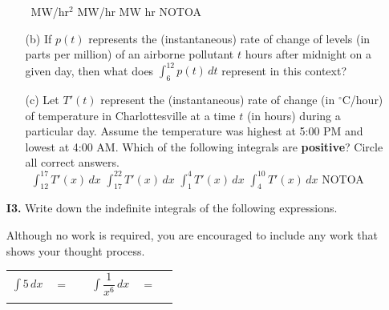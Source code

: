 \documentclass[11pt]{article}
\begin{document}
\begin{itemize}
\begin{itemize}
                \,\hfill
                 MW/hr$^2$
                \hfill
                 MW/hr
                \hfill
                 MW
                \hfill
                 hr
                \hfill
                 NOTOA
                \hfill\,\\
                \medskip{}

            \item[(b)] If $p(t)$ represents the (instantaneous) rate of change of levels (in parts per million) of an airborne pollutant $t$ hours after midnight on a given day, then what does $\displaystyle\int_6^{12} p(t)\,dt$ represent in this context?
                \vspace{6cm}

            \item[(c)] Let $T'(t)$ represent the (instantaneous) rate of change (in $^{\circ}$C/hour) of temperature in Charlottesville at a time $t$ (in hours) during a particular day. Assume the temperature was highest at 5:00 PM and lowest at 4:00 AM. Which of the following integrals are {\bf positive}? Circle all correct answers.\\[0.2in]
                \,\hfill
                 $\displaystyle\int_{12}^{17} T'(x)\,dx$
                \hfill
                 $\displaystyle\int_{17}^{22} T'(x)\,dx$
                \hfill
                 $\displaystyle\int_1^4 T'(x)\,dx$
                \hfill
                 $\displaystyle\int_4^{10} T'(x)\,dx$
                \hfill
                 NOTOA        
        \end{itemize}
        \pagebreak

    \item[\textbf{I3.}] Write down the indefinite integrals of the following expressions. 

        Although no work is required, you are encouraged to include any work that shows your thought process. 


        \begin{center}
            \begin{tabular}{l c r l c r}
                $\displaystyle\int 5\,dx$ & $=$ & \rule[-8pt]{1.5in}{0.4pt} &
                \vspace{5cm}

            $\displaystyle\int \dfrac{1}{x^6} \,dx$ & $=$ & \rule[-8pt]{1.5in}{0.4pt}\\[1in]
            \vspace{5cm}


\end{tabular}
\end{center}
\end{itemize}
\end{document}
